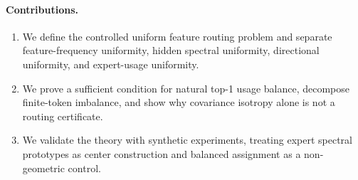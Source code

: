 \paragraph{Contributions.}
\begin{enumerate}
\item We define the controlled uniform feature routing problem and separate
feature-frequency uniformity, hidden spectral uniformity, directional
uniformity, and expert-usage uniformity.
\item We prove a sufficient condition for natural top-1 usage balance, decompose
finite-token imbalance, and show why covariance isotropy alone is not a routing
certificate.
\item We validate the theory with synthetic experiments, treating expert
spectral prototypes as center construction and balanced assignment as a
non-geometric control.
\end{enumerate}
